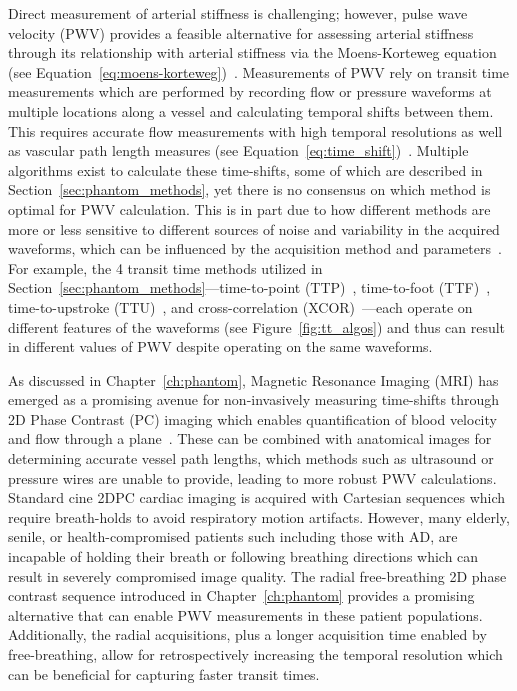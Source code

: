 Direct measurement of arterial stiffness is challenging; however, pulse wave velocity (PWV) provides a feasible alternative for assessing arterial stiffness through its relationship with arterial stiffness via the Moens-Korteweg equation (see Equation~\ref{eq:moens-korteweg})~\cite{newmanValidityMoensKortewegEquation1978, callaghanRelationshipPulsewaveVelocity1986}. Measurements of PWV rely on transit time measurements which are performed by recording flow or pressure waveforms at multiple locations along a vessel and calculating temporal shifts between them. This requires accurate flow measurements with high temporal resolutions as well as vascular path length measures (see Equation~\ref{eq:time_shift})~\cite{wentlandReviewMRIbasedMeasurements2014}. Multiple algorithms exist to calculate these time-shifts, some of which are described in Section~\ref{sec:phantom_methods}, yet there is no consensus on which method is optimal for PWV calculation. This is in part due to how different methods are more or less sensitive to different sources of noise and variability in the acquired waveforms, which can be influenced by the acquisition method and parameters~\cite{vardoulisValidationNovelExisting2013}. For example, the 4 transit time methods utilized in Section~\ref{sec:phantom_methods}---time-to-point (TTP)~\cite{groeninkBiophysicalPropertiesNormalsized2001,doguiMeasurementAorticArch2011}, time-to-foot (TTF)~\cite{lundstromPulseWaveVelocity2022}, time-to-upstroke (TTU)~\cite{doguiMeasurementAorticArch2011}, and cross-correlation (XCOR)~\cite{fieldenNewMethodDetermination2008}---each operate on different features of the waveforms (see Figure~\ref{fig:tt_algos}) and thus can result in different values of PWV despite operating on the same waveforms. 

As discussed in Chapter~\ref{ch:phantom}, Magnetic Resonance Imaging (MRI) has emerged as a promising avenue for non-invasively measuring time-shifts through 2D Phase Contrast (PC) imaging which enables quantification of blood velocity and flow through a plane~\cite{wentlandReviewMRIbasedMeasurements2014}. These can be combined with anatomical images for determining accurate vessel path lengths, which methods such as ultrasound or pressure wires are unable to provide, leading to more robust PWV calculations. Standard cine 2DPC cardiac imaging is acquired with Cartesian sequences which require breath-holds to avoid respiratory motion artifacts. However, many elderly, senile, or health-compromised patients such including those with AD, are incapable of holding their breath or following breathing directions which can result in severely compromised image quality. The radial free-breathing 2D phase contrast sequence introduced in Chapter~\ref{ch:phantom} provides a promising alternative that can enable PWV measurements in these patient populations. Additionally, the radial acquisitions, plus a longer acquisition time enabled by free-breathing, allow for retrospectively increasing the temporal resolution which can be beneficial for capturing faster transit times. 

